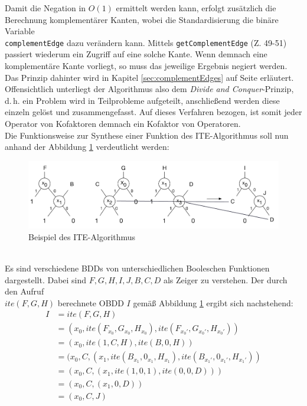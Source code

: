 Damit die Negation in $O(1)$ ermittelt werden kann, erfolgt zusätzlich die Berechnung komplementärer Kanten, wobei die Standardisierung die binäre Variable\\\texttt{complementEdge} dazu verändern kann. Mittels \texttt{getComplementEdge} (Z. 49-51) passiert wiederum ein Zugriff auf eine solche Kante. Wenn demnach eine komplementäre Kante vorliegt, so muss das jeweilige Ergebnis negiert werden. Das Prinzip dahinter wird in Kapitel \ref{sec:complementEdges} auf Seite \pageref{sec:complementEdges} erläutert.\\ 
Offensichtlich unterliegt der Algorithmus also dem \emph{Divide and Conquer}-Prinzip, d.\,h. ein Problem wird in Teilprobleme aufgeteilt, anschließend werden diese einzeln gelöst und zusammengefasst. Auf dieses Verfahren bezogen, ist somit jeder Operator von Kofaktoren demnach ein Kofaktor von Operatoren.\\
Die Funktionsweise zur Synthese einer Funktion des ITE-Algorithmus soll nun anhand der Abbildung \ref{fig:ite} verdeutlicht werden:
\begin{figure}[bth]
	\centering
	\includegraphics[scale=0.5]{./img/ite}
	\caption[Beispiel des ITE-Algorithmus]{Beispiel des ITE-Algorithmus}
	\label{fig:ite}
\end{figure}\\
Es sind verschiedene BDDs von unterschiedlichen Booleschen Funktionen dargestellt. Dabei sind $F, G, H, I, J, B, C, D$ als Zeiger zu verstehen. Der durch den Aufruf\\ $ite(F, G, H)$ berechnete OBDD $I$ gemäß Abbildung \ref{fig:ite} ergibt sich nachstehend:
\begin{equation*}
\begin{split}
I &= ite(F,G,H)\\
  &= (x_0, ite(F_{x_0}, G_{x_0}, H_{x_0}), ite(F_{x_0'}, G_{x_0'}, H_{x_0'}))\\
  &= (x_0, ite(1, C, H), ite(B, 0, H))\\
  &= (x_0, C, (x_1, ite(B_{x_1}, 0_{x_1}, H_{x_1}), ite(B_{x_1'}, 0_{x_1'}, H_{x_1'}))\\
  &= (x_0, C, (x_1, ite(1, 0, 1), ite(0, 0, D)))\\
  &= (x_0, C, (x_1, 0, D))\\
  &= (x_0, C, J)
\end{split}
\end{equation*}
